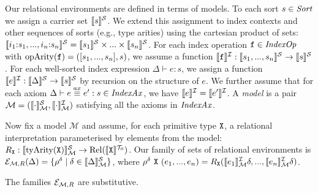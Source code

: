 Our relational environments are defined in terms of
models. To each sort $s \in \mathit{Sort}$ we assign a carrier set
$\llbracket s \rrbracket^{\mathcal{S}}$. We extend this assignment to index contexts and other
sequences of sorts (e.g., type arities) using the cartesian product of
sets: $\llbracket i_1\mathord:s_1,...,i_n\mathord:s_n \rrbracket^{\mathcal{S}} = \llbracket s_1 \rrbracket^{\mathcal{S}}
\times ... \times \llbracket s_n \rrbracket^{\mathcal{S}}$. For each index operation $\texttt{f}
\in \mathit{IndexOp}$ with $\mathrm{opArity}(\texttt{f}) = ([s_1,...,s_n],s)$,
we assume a function $\llbracket \texttt{f} \rrbracket^{\mathcal{I}} : \llbracket s_1,...,s_n \rrbracket^{\mathcal{S}}
\to \llbracket s \rrbracket^{\mathcal{S}}$. For each well-sorted index expression $\Delta \vdash
e : s$, we assign a function $\llbracket e \rrbracket^{\mathcal{I}} : \llbracket \Delta \rrbracket^{\mathcal{S}} \to
\llbracket s \rrbracket^{\mathcal{S}}$ by recursion on the structure of $e$. We further assume
that for each axiom $\Delta \vdash e \stackrel{ax}\equiv e' : s \in
\mathit{IndexAx}$, we have $\llbracket e \rrbracket^{\mathcal{I}} = \llbracket e' \rrbracket^{\mathcal{I}}$. A
\emph{model} is a pair $\mathcal{M} = (\llbracket \cdot \rrbracket^{\mathcal{S}}_{\mathcal{M}},
\llbracket \cdot \rrbracket^{\mathcal{I}}_{\mathcal{M}})$ satisfying all the axioms in
$\mathit{IndexAx}$.

Now fix a model $\mathcal{M}$ and assume, for each primitive type
$\textup{\texttt{X}}$, a relational interpretation parameterised by elements
from the model: $R_{\textup{\texttt{X}}} :
\llbracket \mathrm{tyArity}(\textup{\texttt{X}}) \rrbracket^{\mathcal{S}}_{\mathcal{M}} \to
\mathrm{Rel}(\llbracket \textup{\texttt{X}} \rrbracket^{\mathcal{T}_0})$. Our family of sets of relational
environments is $\mathcal{E}_{\mathcal{M},R}(\Delta) = \{ \rho^\delta
\mathrel| \delta \in \llbracket \Delta \rrbracket^{\mathcal{S}}_{\mathcal{M}} \}$, where
$\rho^\delta\ \textup{\texttt{X}}\ (e_1,...,e_n) =
R_{\textup{\texttt{X}}}(\llbracket e_1 \rrbracket^{\mathcal{I}}_{\mathcal{M}}\delta, ...,
\llbracket e_n \rrbracket^{\mathcal{I}}_{\mathcal{M}}\delta)$.

\begin{theorem}
  The families $\mathcal{E}_{\mathcal{M},R}$ are substitutive.
\end{theorem}


